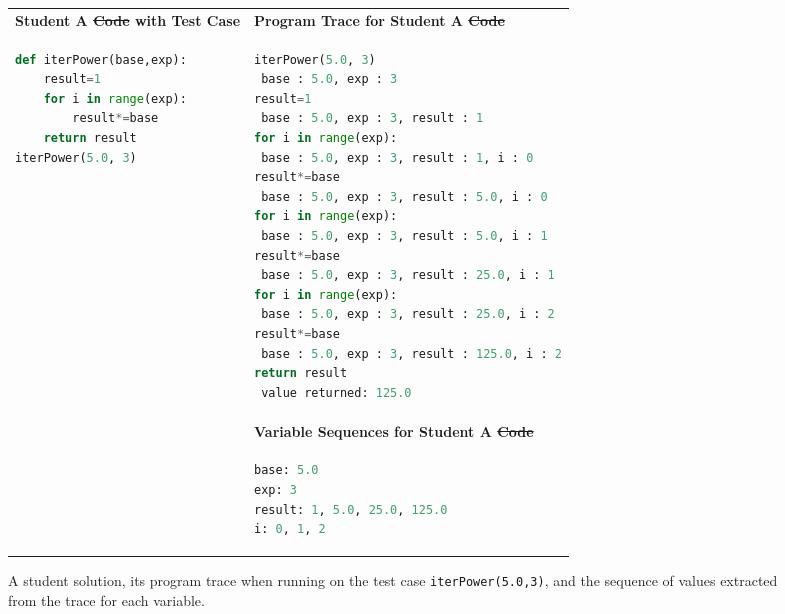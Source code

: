 \documentclass[12pt,twoside]{mitthesis}
\providecommand{\DIFaddtex}[1]{{\protect\color{blue}\uwave{#1}}} %
\providecommand{\DIFdeltex}[1]{{\protect\color{red}\sout{#1}}}                      %
\providecommand{\DIFaddFL}[1]{\DIFadd{#1}} %
\providecommand{\DIFdelFL}[1]{\DIFdel{#1}} %
\providecommand{\DIFaddbeginFL}{} %
\providecommand{\DIFaddendFL}{} %
\providecommand{\DIFdelbeginFL}{} %
\providecommand{\DIFdelendFL}{} %
\providecommand{\DIFadd}[1]{\texorpdfstring{\DIFaddtex{#1}}{#1}} %
\providecommand{\DIFdel}[1]{\texorpdfstring{\DIFdeltex{#1}}{}} %
\begin{document}
\begin{figure}
\begin{tabular}{ll}
{\bf Student A \DIFdelbeginFL \DIFdelFL{Code }\DIFdelendFL \DIFaddbeginFL \DIFaddFL{Solution }\DIFaddendFL with Test Case} & {\bf Program Trace for Student A \DIFdelbeginFL \DIFdelFL{Code}\DIFdelendFL \DIFaddbeginFL \DIFaddFL{Solution}\DIFaddendFL } \\
\begin{minipage}{0.35\linewidth}
\begin{lstlisting}[basicstyle=\linespread{1.0}\ttfamily\footnotesize,language=python]
def iterPower(base,exp):
    result=1
    for i in range(exp):
        result*=base
    return result
iterPower(5.0, 3)
\end{lstlisting}
\end{minipage} &
\begin{minipage}{0.6\linewidth}
\begin{lstlisting}[basicstyle=\linespread{1.0}\ttfamily\footnotesize,language=python,linebackgroundcolor={\lstcolorlines[gray!20]{2,4,6,8,10,12,14,16,18}}]
iterPower(5.0, 3)
 base : 5.0, exp : 3
result=1
 base : 5.0, exp : 3, result : 1 
for i in range(exp):
 base : 5.0, exp : 3, result : 1, i : 0
result*=base
 base : 5.0, exp : 3, result : 5.0, i : 0 
for i in range(exp):
 base : 5.0, exp : 3, result : 5.0, i : 1
result*=base 
 base : 5.0, exp : 3, result : 25.0, i : 1 
for i in range(exp):
 base : 5.0, exp : 3, result : 25.0, i : 2 
result*=base
 base : 5.0, exp : 3, result : 125.0, i : 2
return result
 value returned: 125.0
\end{lstlisting}
\end{minipage} 
\\
& {\bf Variable Sequences for Student A \DIFdelbeginFL \DIFdelFL{Code}\DIFdelendFL \DIFaddbeginFL \DIFaddFL{Solution}\DIFaddendFL } \\
&
\begin{minipage}{0.6\linewidth}
\begin{lstlisting}[language=python]
base: 5.0
exp: 3
result: 1, 5.0, 25.0, 125.0
i: 0, 1, 2
\end{lstlisting}
\end{minipage}
\end{tabular}
\caption{A student solution, its program trace when running on the test case \texttt{iterPower(5.0,3)}, and the sequence of values extracted from the trace for each variable.}
\label{fig:extractsequence}
\end{figure}
\end{document}
